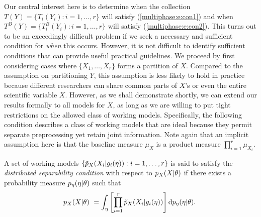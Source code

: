 Our central interest here is to determine when the collection $T(Y)=\{T_i(Y_i): i=1,\ldots, r\}$ will satisfy (\ref{multiphase:e:con1}) and when $T^{B}(Y)=\{T_i^B(Y_i): i=1,\ldots, r\}$ will satisfy (\ref{multiphase:e:con2}).
This turns out to be an exceedingly difficult problem if we seek a necessary and sufficient condition for \textit{when} this occurs.
However, it is not difficult to identify sufficient conditions that can provide useful practical guidelines.
We proceed by first considering cases where $\{X_1, \ldots, X_r\}$ forms a partition of $X$.
Compared to the assumption on partitioning $Y$, this assumption is less likely to hold in practice because different researchers can share common  parts of $X$'s or even  the entire  scientific variable $X$.
However, as we shall demonstrate shortly,  we can extend our results formally to all models for $X$, as long as we are willing  to put tight restrictions on the allowed class of working models.
Specifically, the following condition describes a class of working models that are ideal because they permit separate preprocessing yet retain joint information.
 Note again that an implicit assumption here is that the baseline measure $\mu_X$ is a product measure $\prod_{i=1}^r\mu_{X_i}$.
\begin{definition}
A set of working models $\{\tilde{p}_X(X_i |g_{i}(\eta)): i=1,\ldots, r\}$ is said to satisfy the \emph{distributed separability condition} with respect to $p_X(X | \theta)$ if there exists a probability measure $p_\eta( \eta | \theta)$ such that
\begin{equation}
 \psci(X | \param)\ = \int_\eta\left[ \prod_{i=1}^r \pwork(X_i | g_i(\workparam)) \right]\dd p_\workparam(\workparam | \param).\  \label{multiphase:eq:dsc}
\end{equation}
\end{definition}



